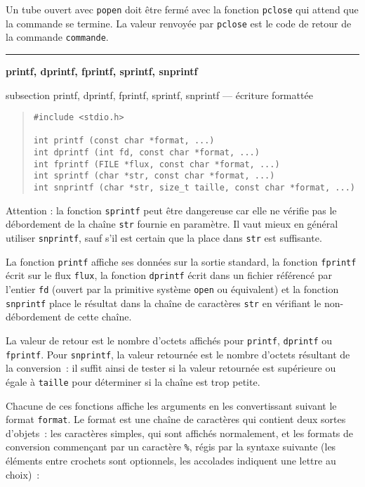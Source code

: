 \documentclass [twoside] {report}
\newcommand {\primitive} [1]
    {
	\phantomsection
	{\large \textbf {#1}}
	\addcontentsline {toc} {subsection} {#1}
    }
\newcommand {\separation}
    {
	\vspace {5mm}
	\nopagebreak
	\hrule
    }
\begin{document}
Un tube ouvert avec \texttt {popen} doit être fermé avec la
fonction \texttt {pclose} qui attend que la commande se termine. La
valeur renvoyée par \texttt {pclose} est le code de retour de la
commande \texttt {commande}.



\separation
\primitive {printf, dprintf, fprintf, sprintf, snprintf} --- écriture formattée

\begin {quote}
\begin {verbatim}
#include <stdio.h>

int printf (const char *format, ...)
int dprintf (int fd, const char *format, ...)
int fprintf (FILE *flux, const char *format, ...)
int sprintf (char *str, const char *format, ...)
int snprintf (char *str, size_t taille, const char *format, ...)
\end{verbatim}
\end {quote}

Attention : la fonction \texttt {sprintf} peut être dangereuse car
elle ne vérifie pas le débordement de la chaîne \texttt{str} fournie
en paramètre. Il vaut mieux en général utiliser \texttt{snprintf},
sauf s'il est certain que la place dans \texttt{str} est suffisante.

La fonction \texttt {printf} affiche ses données sur la sortie standard, la
fonction \texttt {fprintf} écrit sur le flux \texttt {flux}, la fonction \texttt
{dprintf} écrit dans un fichier référencé par l'entier \texttt {fd}
(ouvert par la primitive système \texttt {open} ou équivalent) et la
fonction \texttt {snprintf} place le résultat dans la chaîne de caractères
\texttt {str} en vérifiant le non-débordement de cette chaîne.

La valeur de retour est le nombre d'octets affichés pour \texttt
{printf}, \texttt {dprintf} ou \texttt {fprintf}. Pour \texttt {snprintf},
la valeur retournée est le nombre d'octets résultant de la conversion~:
il suffit ainsi de tester si la valeur retournée est supérieure ou
égale à \texttt {taille} pour déterminer si la chaîne est trop petite.

Chacune de ces fonctions affiche les arguments en les convertissant
suivant le format \texttt {format}.  Le format est une chaîne de caractères
qui contient deux sortes d'objets~:  les caractères simples, qui sont
affichés normalement, et les formats de conversion commençant par un
caractère \texttt {\%}, régis par la syntaxe suivante (les éléments entre
crochets sont optionnels, les accolades indiquent une lettre au choix)~:
\end{document}
